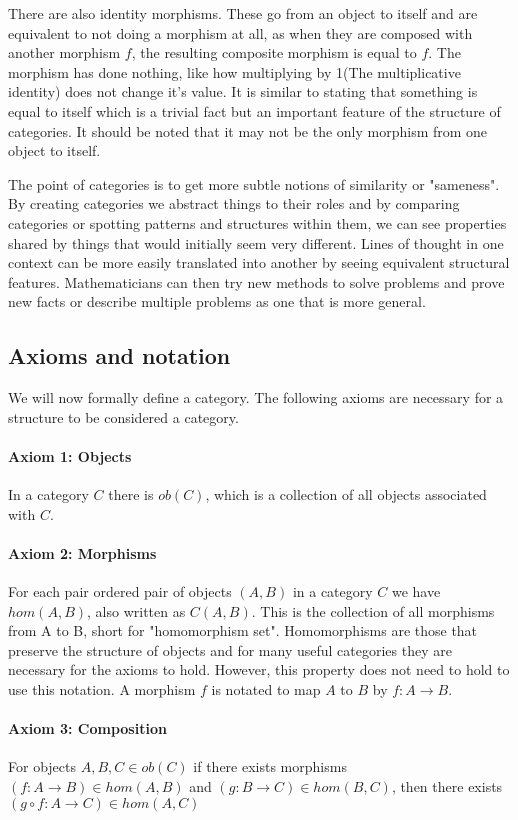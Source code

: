 \documentclass[10pt,a4paper]{amsart}
\begin{document}
There are also identity morphisms.
These go from an object to itself and are equivalent to not doing a morphism at all,
as when they are composed with another morphism $f$, the resulting composite morphism is equal to $f$.
The morphism has done nothing, like how multiplying by 1(The multiplicative identity) does not change it's value.
It is similar to stating that something is equal to itself which is a trivial fact but an important feature of the structure of categories.
It should be noted that it may not be the only morphism from one object to itself.

The point of categories is to get more subtle notions of similarity or "sameness".
By creating categories we abstract things to their roles and by comparing categories or spotting patterns and structures within them,
we can see properties shared by things that would initially seem very different.
Lines of thought in one context can be more easily translated into another by seeing equivalent structural features.
Mathematicians can then try new methods to solve problems and prove new facts or describe multiple problems as one that is more general.
\subsection{Axioms and notation}
We will now formally define a category. The following axioms are necessary for a structure to be considered a category.
\paragraph{Axiom 1: Objects}
In a category $C$ there is $ob(C)$, which is a collection of all objects associated with $C$.
\paragraph{Axiom 2: Morphisms}
For each pair ordered pair of objects $(A,B)$ in a category $C$ we have $hom(A,B)$, also written as $C(A,B)$.
This is the collection of all morphisms from A to B, short for "homomorphism set".
Homomorphisms are those that preserve the structure of objects and for many useful categories they are necessary for the axioms to hold.
However, this property does not need to hold to use this notation.
A morphism $f$ is notated to map $A$ to $B$ by $f: A\to B$.
\paragraph{Axiom 3: Composition}
For objects $A,B,C\in ob(C)$ if there exists morphisms $(f: A\to B)\in hom(A,B)$ and $(g: B\to C)\in hom(B,C)$, then there exists $(g\circ f: A\to C)\in hom(A,C)$
\end{document}
